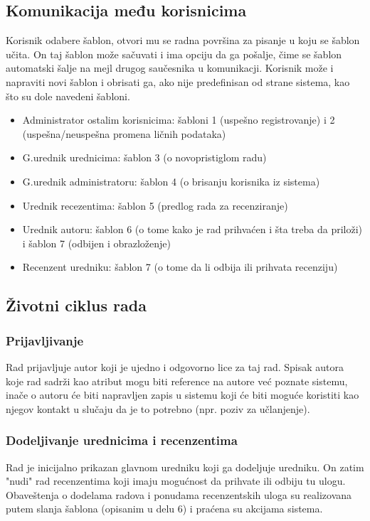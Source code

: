 \documentclass[a4paper]{article}
\begin{document}
\subsection{Komunikacija među korisnicima}
Korisnik odabere šablon, otvori mu se radna površina za pisanje u koju se šablon učita. On taj šablon može sačuvati i ima opciju da ga pošalje, čime se šablon automatski šalje na mejl drugog saučesnika u komunikacji. Korisnik može i napraviti novi šablon i obrisati ga, ako nije predefinisan od strane sistema, kao što su dole navedeni šabloni.
\begin{itemize}
\item Administrator ostalim korisnicima: šabloni 1 (uspešno registrovanje) i 2 (uspešna/neuspešna promena ličnih podataka)
\item G.urednik urednicima: šablon 3 (o novopristiglom radu)
\item G.urednik administratoru: šablon 4 (o brisanju korisnika iz sistema)
\item Urednik recezentima: šablon 5 (predlog rada za recenziranje)
\item Urednik autoru: šablon 6 (o tome kako je rad prihvaćen i šta treba da priloži) i  šablon 7 (odbijen i obrazloženje) 
\item Recenzent uredniku: šablon 7 (o tome da li odbija ili prihvata recenziju)
\end{itemize}

\subsection{Životni ciklus rada}
\subsubsection{Prijavljivanje}
Rad prijavljuje autor koji je ujedno i odgovorno lice za taj rad. Spisak autora koje rad sadrži kao atribut mogu biti reference na autore već poznate sistemu, inače o autoru će biti napravljen zapis u sistemu koji će biti moguće koristiti kao njegov kontakt u slučaju da je to potrebno (npr. poziv za učlanjenje).
\subsubsection{Dodeljivanje urednicima i recenzentima}
Rad je inicijalno prikazan glavnom uredniku koji ga dodeljuje uredniku. On zatim "nudi" rad recenzentima koji imaju mogućnost da prihvate ili odbiju tu ulogu. Obaveštenja o dodelama radova i ponudama recenzentskih uloga su realizovana putem slanja šablona (opisanim u delu 6) i praćena su akcijama sistema.
\end{document}
